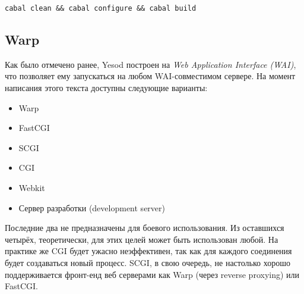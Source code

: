 \begin{lstlisting}
cabal clean && cabal configure && cabal build
\end{lstlisting}

%
\subsection{Warp}
%
%
%

Как было отмечено ранее, Yesod построен на \emph{Web Application Interface (WAI)}, что позволяет ему запускаться на любом WAI-совместимом сервере. На момент написания этого текста доступны следующие варианты:
\begin{itemize}
    \item Warp
    \item FastCGI
    \item SCGI
    \item CGI
    \item Webkit
    \item Сервер разработки (development server)
\end{itemize}


%

Последние два не предназначены для боевого %
использования. Из оставшихся четырёх, теоретически, для этих целей может быть использован любой. На практике же CGI будет ужасно неэффективен, так как для каждого соединения будет создаваться новый процесс. SCGI, в свою очередь, не настолько хорошо поддерживается фронт-енд веб серверами как Warp (через reverse proxying) %
или FastCGI.

